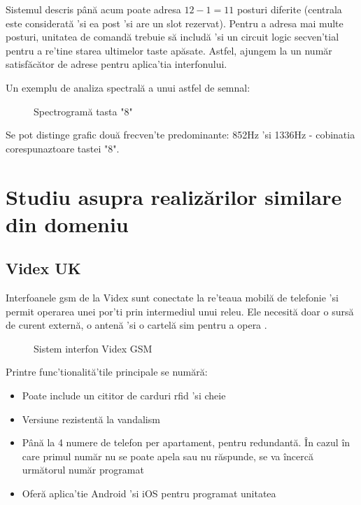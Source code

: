 Sistemul descris până acum poate adresa $12-1=11$ posturi diferite (centrala este considerată 'si ea post 'si are un slot rezervat). Pentru a adresa mai multe posturi, unitatea de comandă trebuie să includă 'si un circuit logic secven'tial pentru a re'tine starea ultimelor taste apăsate. Astfel, ajungem la un număr satisfăcător de adrese pentru aplica'tia interfonului. 

Un exemplu de analiza spectrală a unui astfel de semnal:

\begin{figure}[h!]
  \centering
  \caption{Spectrogramă tasta "8" \cite{AunsriNattapol2016}}
\end{figure}

Se pot distinge grafic două frecven'te predominante: 852Hz 'si 1336Hz - cobinatia corespunaztoare tastei "8".

\section {Studiu asupra realizărilor similare din domeniu}


\subsection {Videx UK}

Interfoanele \acrshort{gsm} de la Videx sunt conectate la re'teaua mobilă de telefonie 'si permit operarea unei por'ti prin intermediul unui releu. Ele necesită doar o sursă de curent externă, o antenă 'si o cartelă \acrfull{sim} pentru a opera \cite{VidexUk}.

\begin{figure}[h!]
  \centering
  \caption{Sistem interfon Videx GSM \cite{VidexUk}}
\end{figure}

Printre func'tionalită'tile principale se numără:
\begin{itemize}
  \item Poate include un cititor de carduri \acrshort{rfid} 'si cheie
  \item Versiune rezistentă la vandalism
  \item Până la 4 numere de telefon per apartament, pentru redundantă. În cazul în care primul număr nu se poate apela sau nu răspunde, se va încercă următorul număr programat
  \item Oferă aplica'tie Android 'si iOS pentru programat unitatea
\end{itemize}

